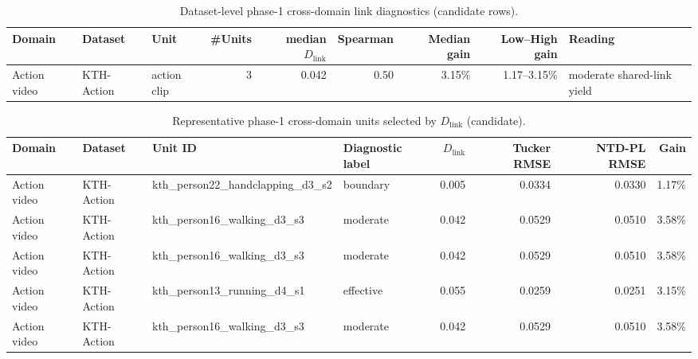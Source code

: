 
\begin{table}[t]
\centering
\caption{Dataset-level phase-1 cross-domain link diagnostics (candidate rows).}
\begin{tabular}{@{}l l l r r r r r l@{}}
\toprule
Domain & Dataset & Unit & \#Units & median $D_{\mathrm{link}}$ & Spearman & Median gain & Low--High gain & Reading \\
\midrule
Action video & KTH-Action & action clip & 3 & 0.042 & 0.50 & 3.15\% & 1.17--3.15\% & moderate shared-link yield \\
\bottomrule
\end{tabular}
\end{table}

\begin{table}[t]
\centering
\caption{Representative phase-1 cross-domain units selected by $D_{\mathrm{link}}$ (candidate).}
\begin{tabular}{@{}l l l l r r r r@{}}
\toprule
Domain & Dataset & Unit ID & Diagnostic label & $D_{\mathrm{link}}$ & Tucker RMSE & NTD-PL RMSE & Gain \\
\midrule
Action video & KTH-Action & kth_person22_handclapping_d3_s2 & boundary & 0.005 & 0.0334 & 0.0330 & 1.17\% \\
Action video & KTH-Action & kth_person16_walking_d3_s3 & moderate & 0.042 & 0.0529 & 0.0510 & 3.58\% \\
Action video & KTH-Action & kth_person16_walking_d3_s3 & moderate & 0.042 & 0.0529 & 0.0510 & 3.58\% \\
Action video & KTH-Action & kth_person13_running_d4_s1 & effective & 0.055 & 0.0259 & 0.0251 & 3.15\% \\
Action video & KTH-Action & kth_person16_walking_d3_s3 & moderate & 0.042 & 0.0529 & 0.0510 & 3.58\% \\
\bottomrule
\end{tabular}
\end{table}
